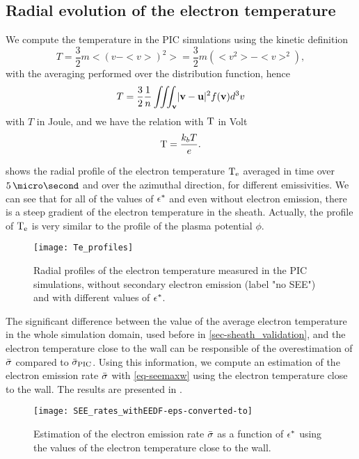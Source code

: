    \subsection{Radial evolution of the electron temperature}
     \label{subsec-Radial_Te}
     
     We compute the temperature in the \ac{PIC} simulations using the kinetic definition
     \[ T   = \frac{3}{2} m < (v - <v>)^2 > =  \frac{3}{2} m (<v^2> - <v>^2), \]
     with the averaging performed over the distribution function, hence
     \begin{equation} \label{eq-TeDef}
       T = \frac{3}{2} \frac{1}{n} \iiint_{{\mathbf v}} \lvert{\mathbf v} - {\mathbf u}\rvert^2 f({\mathbf v}) d^3v 
     \end{equation}
     with $T$ in Joule, and we have the relation with ${\rm T}$ in Volt
     \[  {\rm T} = \frac{k_b T}{e}.  \]
       
      shows the radial profile of the electron temperature $\mathrm{T_e}$ averaged in time over $5\,\micro\second$ and over the azimuthal direction, for different emissivities.
     We can see that for all of the values of $\epsilon^{*}$ and even without electron emission, there is a steep gradient of the electron temperature in the sheath.
     Actually, the profile of $\mathrm{T_e}$ is very similar to the profile of the plasma potential $\phi$.
   
   \begin{figure}[hbtp]
     \centering
     \texttt{[image: Te\_profiles]}
     \caption{Radial profiles of the electron temperature measured in the \ac{PIC} simulations, without secondary electron emission (label "no SEE") and with different values of $\epsilon^{*}$.  }
     \label{fig-te_profile_see}
   \end{figure}
   
   The significant difference between the value of the average electron temperature in the whole simulation domain, used before in \cref{sec-sheath_validation}, and the electron temperature close to the wall can be responsible of the overestimation of $ \bar{\sigma }$ compared to $ \bar{\sigma }_{\rm PIC}$.
   Using this information, we compute an estimation of the electron emission rate $ \bar{\sigma }$ with \cref{eq-seemaxw} using the electron temperature close to the wall.
   The results are presented in .
   
   \begin{figure}[hbtp]
     \centering
     \texttt{[image: SEE\_rates\_withEEDF-eps-converted-to]}
     \caption{Estimation of the electron emission rate $ \bar{\sigma }$ as a function of $\epsilon^{*}$ using the values of the electron temperature close to the wall.}
     \label{fig-rate_pic_wall}
   \end{figure}
   
